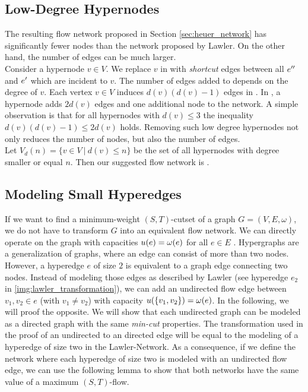 \subsection{Low-Degree Hypernodes}
\label{sec:degree_network}

The resulting flow network  proposed in Section \ref{sec:heuer_network} has significantly
fewer nodes than the network  proposed by Lawler. On the other hand, the number of
edges can be much larger. \\
Consider a hypernode $v \in V$. We replace $v$ in  with \emph{shortcut} edges between all
$e''$ and $e'$ which are incident to $v$. The number of edges added to  depends on the degree of
$v$. Each vertex $v \in V$ induces $d(v)(d(v) - 1)$ edges in . 
In , a hypernode adds $2d(v)$ edges and one additional node
to the network. A simple observation is that for all hypernodes with $d(v) \le 3$ the inequality
$d(v)(d(v) - 1) \le 2d(v)$ holds. Removing such low degree hypernodes not only reduces
the number of nodes, but also the number of edges. \\
Let $V_{d}(n) = \{v \in V\ |\ d(v) \le n\}$ be the set of all hypernodes
with degree smaller or equal $n$. Then our suggested flow network is .

\subsection{Modeling Small Hyperedges}
\label{sec:edge_size_network}

If we want to find a minimum-weight $(S,T)$-cutset of a graph $G = (V,E,\omega)$, we do not have to transform
$G$ into an equivalent flow network. We can directly operate on the graph with capacities
$u(e) = \omega(e)$ for all $e \in E$ \cite{ford1956maximal}. Hypergraphs are a generalization of graphs, where
an edge can consist of more than two nodes. However, a hyperedge $e$ of size $2$ is equivalent to 
a graph edge connecting two nodes. Instead of modeling those edges as described by Lawler \cite{lawler1973}
(see hyperedge $e_2$ in \autoref{img:lawler_transformation}), we can add an undirected 
flow edge between $v_1,v_2 \in e$ (with $v_1 \neq v_2$) with capacity $u(\{v_1,v_2\}) = \omega(e)$.
In the following, we will proof the opposite. We will show that each undirected graph can be modeled
as a directed graph with the same \emph{min-cut} properties. The transformation used in the proof
of an undirected to an directed edge will be equal to the modeling of a hyperedge of size two
in the Lawler-Network. As a consequence, if we define the network where each hyperedge 
of size two is modeled with an undirected flow edge, we can use the following lemma to show
that both networks have the same value of a maximum $(S,T)$-flow.

